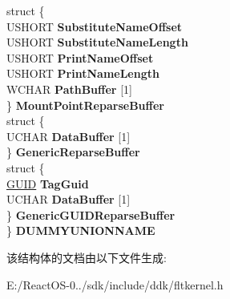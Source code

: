 \begin{DoxyCompactItemize}
\begin{tabbing}
\>struct \{\\
\>\>USHORT {\bfseries SubstituteNameOffset}\\
\>\>USHORT {\bfseries SubstituteNameLength}\\
\>\>USHORT {\bfseries PrintNameOffset}\\
\>\>USHORT {\bfseries PrintNameLength}\\
\>\>WCHAR {\bfseries PathBuffer} \mbox{[}1\mbox{]}\\
\>\} {\bfseries MountPointReparseBuffer}\\
\>struct \{\\
\>\>UCHAR {\bfseries DataBuffer} \mbox{[}1\mbox{]}\\
\>\} {\bfseries GenericReparseBuffer}\\
\>struct \{\\
\>\>\hyperlink{interface_g_u_i_d}{GUID} {\bfseries TagGuid}\\
\>\>UCHAR {\bfseries DataBuffer} \mbox{[}1\mbox{]}\\
\>\} {\bfseries GenericGUIDReparseBuffer}\\
\} {\bfseries DUMMYUNIONNAME}\\

\end{tabbing}\end{DoxyCompactItemize}


该结构体的文档由以下文件生成\+:\begin{DoxyCompactItemize}
\item 
E\+:/\+React\+O\+S-\/0../sdk/include/ddk/fltkernel.\+h\end{DoxyCompactItemize}
